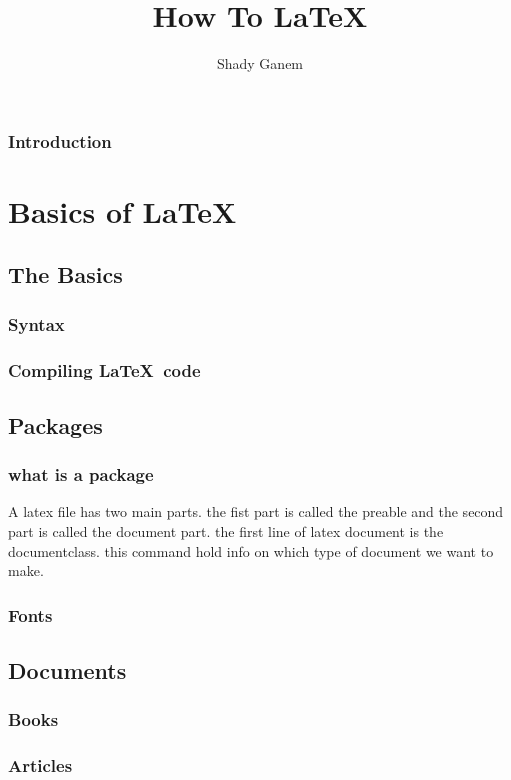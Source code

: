 \documentclass[12pt]{book}
\title{How To \LaTeX}
\author{Shady Ganem}
\begin{document}
\maketitle
\tableofcontents
\section*{Introduction}

\part{Basics of \LaTeX}
\chapter{The Basics}
\section{Syntax}
\section{Compiling \LaTeX \ code}
\chapter{Packages}
\section{what is a package}
A latex file has two main parts.
\newline the fist part is called the preable and the second part is called the document part.
\newline the first line of latex document is the documentclass. this command hold info on which type of
document we want to make.
\section{Fonts}
\chapter{Documents}
\section{Books}
\section{Articles}
\end{document}
